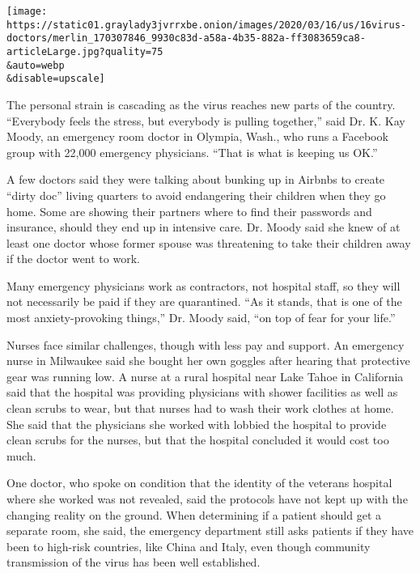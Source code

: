 \texttt{[image: https://static01.graylady3jvrrxbe.onion/images/2020/03/16/us/16virus-doctors/merlin\_170307846\_9930c83d-a58a-4b35-882a-ff3083659ca8-articleLarge.jpg?quality=75\\\&auto=webp\\\&disable=upscale]}

The personal strain is cascading as the virus reaches new parts of the
country. ``Everybody feels the stress, but everybody is pulling
together,'' said Dr. K. Kay Moody, an emergency room doctor in Olympia,
Wash., who runs a Facebook group with 22,000 emergency physicians.
``That is what is keeping us OK.''

A few doctors said they were talking about bunking up in Airbnbs to
create ``dirty doc'' living quarters to avoid endangering their children
when they go home. Some are showing their partners where to find their
passwords and insurance, should they end up in intensive care. Dr. Moody
said she knew of at least one doctor whose former spouse was threatening
to take their children away if the doctor went to work.

Many emergency physicians work as contractors, not hospital staff, so
they will not necessarily be paid if they are quarantined. ``As it
stands, that is one of the most anxiety-provoking things,'' Dr. Moody
said, ``on top of fear for your life.''

Nurses face similar challenges, though with less pay and support. An
emergency nurse in Milwaukee said she bought her own goggles after
hearing that protective gear was running low. A nurse at a rural
hospital near Lake Tahoe in California said that the hospital was
providing physicians with shower facilities as well as clean scrubs to
wear, but that nurses had to wash their work clothes at home. She said
that the physicians she worked with lobbied the hospital to provide
clean scrubs for the nurses, but that the hospital concluded it would
cost too much.

One doctor, who spoke on condition that the identity of the veterans
hospital where she worked was not revealed, said the protocols have not
kept up with the changing reality on the ground. When determining if a
patient should get a separate room, she said, the emergency department
still asks patients if they have been to high-risk countries, like China
and Italy, even though community transmission of the virus has been well
established.

\href{https://www.nytimes3xbfgragh.onion/news-event/coronavirus?action=click\&pgtype=Article\&state=default\&region=MAIN_CONTENT_3\&context=storylines_faq}{}

